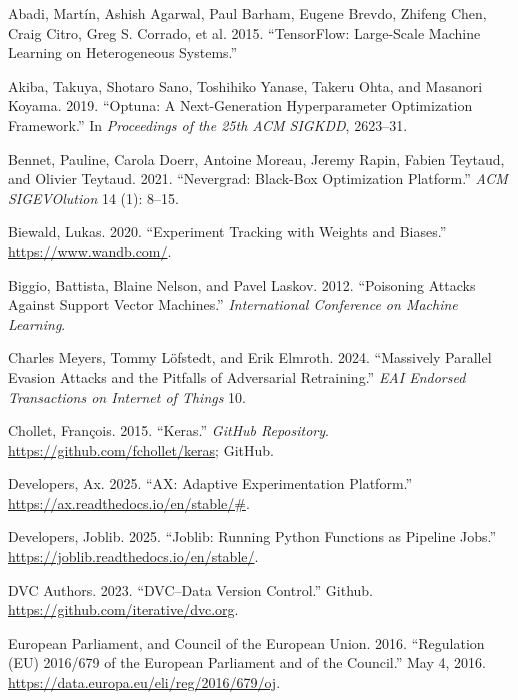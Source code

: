 \documentclass[
]{article}
\newlength{\cslhangindent}
\newlength{\cslentryspacingunit} %
\newenvironment{CSLReferences}[2] %
 {%
  \setlength{\parindent}{0pt}
  \ifodd #1
  \let\oldpar\par
  \def\par{\hangindent=\cslhangindent\oldpar}
  \fi
  \setlength{\parskip}{#2\cslentryspacingunit}
 }%
 {}
\begin{document}
\hypertarget{refs}{}
\begin{CSLReferences}{1}{0}
\leavevmode{}%
Abadi, Martín, Ashish Agarwal, Paul Barham, Eugene Brevdo, Zhifeng Chen,
Craig Citro, Greg S. Corrado, et al. 2015. {``{TensorFlow}: Large-Scale
Machine Learning on Heterogeneous Systems.''}

\leavevmode{}%
Akiba, Takuya, Shotaro Sano, Toshihiko Yanase, Takeru Ohta, and Masanori
Koyama. 2019. {``Optuna: A Next-Generation Hyperparameter Optimization
Framework.''} In \emph{Proceedings of the 25th ACM SIGKDD}, 2623--31.

\leavevmode{}%
Bennet, Pauline, Carola Doerr, Antoine Moreau, Jeremy Rapin, Fabien
Teytaud, and Olivier Teytaud. 2021. {``Nevergrad: Black-Box Optimization
Platform.''} \emph{ACM SIGEVOlution} 14 (1): 8--15.

\leavevmode{}%
Biewald, Lukas. 2020. {``Experiment Tracking with Weights and Biases.''}
\url{https://www.wandb.com/}.

\leavevmode{}%
Biggio, Battista, Blaine Nelson, and Pavel Laskov. 2012. {``Poisoning
Attacks Against Support Vector Machines.''} \emph{International
Conference on Machine Learning}.

\leavevmode{}%
Charles Meyers, Tommy Löfstedt, and Erik Elmroth. 2024. {``Massively
Parallel Evasion Attacks and the Pitfalls of Adversarial Retraining.''}
\emph{EAI Endorsed Transactions on Internet of Things} 10.

\leavevmode{}%
Chollet, François. 2015. {``Keras.''} \emph{GitHub Repository}.
\url{https://github.com/fchollet/keras}; GitHub.

\leavevmode{}%
Developers, Ax. 2025. {``AX: Adaptive Experimentation Platform.''}
\url{https://ax.readthedocs.io/en/stable/\#}.

\leavevmode{}%
Developers, Joblib. 2025. {``Joblib: Running Python Functions as
Pipeline Jobs.''} \url{https://joblib.readthedocs.io/en/stable/}.

\leavevmode{}%
DVC Authors. 2023. {``{DVC}--{Data Version Control}.''} Github.
\url{https://github.com/iterative/dvc.org}.

\leavevmode{}%
European Parliament, and Council of the European Union. 2016.
{``Regulation ({EU}) 2016/679 of the {European} {Parliament} and of the
{Council}.''} May 4, 2016.
\url{https://data.europa.eu/eli/reg/2016/679/oj}.


\end{CSLReferences}
\end{document}
